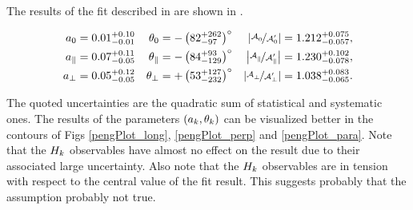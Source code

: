 The results of the \chisq fit described in  are shown in .

\begin{subequations}
\label{peng_a_theta_results}
\begin{align}
    a_{0}         & = 0.01^{+0.10}_{-0.01} & \theta_{0}         & = -\left( 82^{+262}_{-97} \right)^\circ &  \left| \nicefrac{\mathcal{A}_{0}^{} }{\mathcal{A}_{0}^{\prime}} \right|          = 1.212^{+0.075}_{-0.057},\\
    a_{\parallel} & = 0.07^{+0.11}_{-0.05} & \theta_{\parallel} & = -\left( 84^{+93}_{-129} \right)^\circ  &  \left| \nicefrac{\mathcal{A}_{\parallel}^{} }{\mathcal{A}_{\parallel}^{\prime}} \right|  = 1.230^{+0.102}_{-0.078},\\
    a_{\perp}     & = 0.05^{+0.12}_{-0.05} & \theta_{\perp}     & = +\left( 53^{+127}_{-232} \right)^\circ &  \left| \nicefrac{\mathcal{A}_{\perp}^{} }{\mathcal{A}_{\perp}^{\prime}} \right|      = 1.038^{+0.083}_{-0.065}.
\end{align}
\end{subequations}

\noindent The quoted uncertainties are the quadratic sum of statistical and systematic ones.
The results of the parameters $(a_k,\theta_k)$ can be visualized better in the contours of
Figs \ref{pengPlot_long}, \ref{pengPlot_perp} and \ref{pengPlot_para}. Note that the $H_{k}$
observables have almost no effect on the result due to their associated large uncertainty.
Also note that the $H_{k}$ observables are in tension with respect to the central value of
the fit result. This suggests probably that the assumption  probably
not true.

